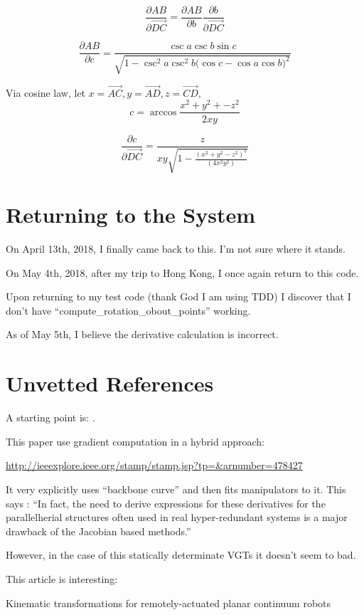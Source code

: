\documentclass[11pt]{article}
\begin{document}
\[
\frac{\partial AB }{\partial \overrightarrow{DC}}   =  \frac{\partial AB }{\partial b} \frac{\partial b}{\partial \overrightarrow{DC}} 
\]

\[
\frac{\partial AB }{\partial c} =
\frac{\csc{a} \csc{b} \sin{c}}
 {\sqrt{1 - \csc^2{a} \csc^2{b} \big( \cos{c} - \cos{a} \cos{b}\big)^2}}
\]

Via cosine law, let $x = \overrightarrow{AC}, y = \overrightarrow{AD}, z = \overrightarrow{CD}$,
\[
c = \arccos{\frac{x^2 + y^2 + -z^2}{2xy}}
\]

\[
\frac{\partial c}{\partial \overrightarrow{DC}} = \frac{z}{x y \sqrt{1 -
    \frac{(x^2 + y^2 - z^2)^2}{(4 x^2 y^2)}}}
\]

\section{Returning to the System}

On April 13th, 2018, I finally came back to this. I'm not sure where it stands.

On May 4th, 2018, after my trip to Hong Kong, I once again return to this code.

Upon returning to my test code (thank God I am using TDD) I discover that I don't have ``compute_rotation_obout_points'' working.

As of May 5th, I believe the derivative calculation is incorrect.


\section{Unvetted References}

A starting point is: \cite{Hanahara2008}.

This paper use gradient computation in a hybrid approach:

\url{http://ieeexplore.ieee.org/stamp/stamp.jsp?tp=&arnumber=478427}

It very explicitly uses ``backbone curve'' and then fits manipulators to it.
This says :  ``In fact, the need to derive expressions for these
derivatives for the parallelherial structures often used in real
hyper-redundant systems is a major drawback of the Jacobian
based methods.''

However, in the case of this statically determinate VGTs it doesn't seem to bad.

This article is interesting:

Kinematic transformations for remotely-actuated planar continuum robots
\end{document}
